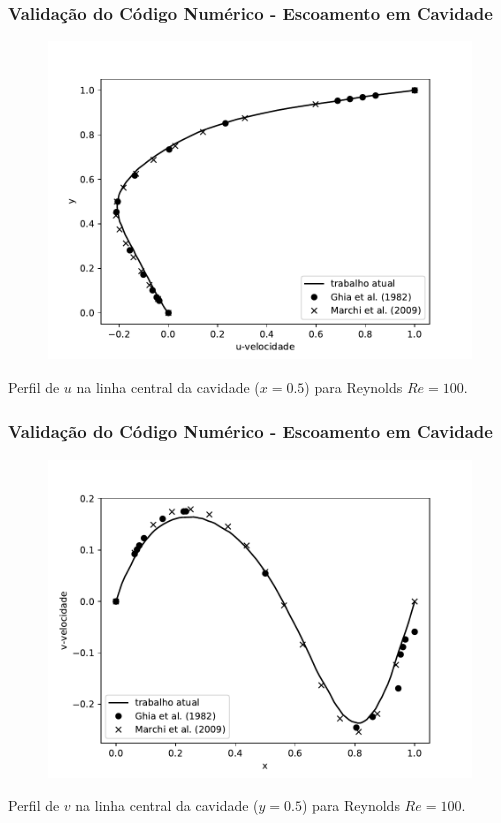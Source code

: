 
\begin{frame}
 \frametitle{\small Validação do Código Numérico - Escoamento em Cavidade}
\begin{figure}
  \centering
  \vspace{-1.5cm}
  \includegraphics[scale=0.6]{images/Re_100_u_profile.pdf}
\end{figure}
\vspace{-0.2cm}
\centering \scriptsize Perfil de $u$ na linha central da cavidade ($x=0.5$) para Reynolds $Re=100$.
\end{frame}


\begin{frame}
 \frametitle{\small Validação do Código Numérico - Escoamento em Cavidade}
\begin{figure}
  \centering
  \vspace{-1.5cm}
  \includegraphics[scale=0.6]{images/Re_100_v_profile.pdf}
\end{figure}
\vspace{-0.2cm}
\centering \scriptsize Perfil de $v$ na linha central da cavidade ($y=0.5$) para Reynolds $Re=100$.
\end{frame}

